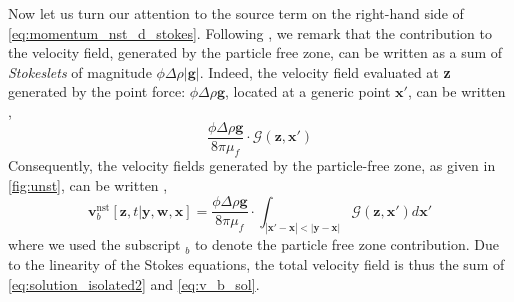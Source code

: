 Now let us turn our attention to the source term on the right-hand side of \ref{eq:momentum_nst_d_stokes}. 
Following \citet{zhang2021ensemble}, we remark that the contribution to the velocity field, generated by the particle free zone, can be written as a sum of \textit{Stokeslets} of magnitude $\phi\Delta \rho |\textbf{g}|$.
Indeed, the velocity field evaluated at \textbf{z} generated by the point force:  $\phi\Delta \rho \textbf{g}$, located at a generic point $\textbf{x}'$, can be written \citep{pozrikidis1992boundary}, 
\begin{equation}
    \frac{\phi\Delta \rho \textbf{g}}{8\pi \mu_f}\cdot \mathcal{G}(\textbf{z},\textbf{x}')
\end{equation}
Consequently, the velocity fields generated by the particle-free zone, as given in \ref{fig:unst}, can be written \citep{zhang2021ensemble}, 
\begin{equation}
    \textbf{v}_b^\text{nst}[\textbf{z},t|\textbf{y},\textbf{w},\textbf{x}]
    = 
    \frac{\phi\Delta \rho \textbf{g}}{8\pi \mu_f}\cdot 
    \int_{|\textbf{x}'-\textbf{x}|< |\textbf{y}- \textbf{x}|}
    \mathcal{G}(\textbf{z},\textbf{x}')
    d\textbf{x}'
    \label{eq:v_b_sol}
\end{equation}
where we used the subscript $_b$ to denote the particle free zone contribution. 
Due to the linearity of the Stokes equations, the total velocity field is thus the sum of \ref{eq:solution_isolated2} and \ref{eq:v_b_sol}. 

